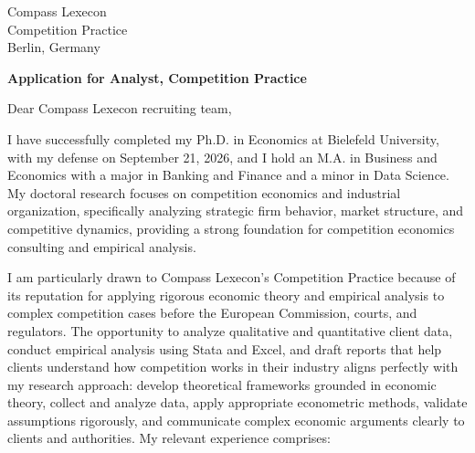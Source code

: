 \documentclass[11pt]{article}
\begin{document}
\vspace{0.1cm}

\vspace{0.1cm}

\noindent
Compass Lexecon \\
Competition Practice \\
Berlin, Germany

\vspace{0.12cm}

\noindent
\textbf{Application for Analyst, Competition Practice}

\vspace{0.1cm}

\noindent Dear Compass Lexecon recruiting team,

I have successfully completed my Ph.D. in Economics at Bielefeld University, with my defense on September 21, 2026, 
and I hold an M.A. in Business and Economics with a major in Banking and Finance and a minor in Data Science. 
My doctoral research focuses on competition economics and industrial organization, 
specifically analyzing strategic firm behavior, market structure, and competitive dynamics, 
providing a strong foundation for competition economics consulting and empirical analysis.

I am particularly drawn to Compass Lexecon's Competition Practice because of its reputation for applying rigorous economic theory and empirical analysis to complex competition cases before the European Commission, courts, and regulators. 
The opportunity to analyze qualitative and quantitative client data, conduct empirical analysis using Stata and Excel, and draft reports that help clients understand how competition works in their industry aligns perfectly with my research approach: 
develop theoretical frameworks grounded in economic theory, collect and analyze data, apply appropriate econometric methods, 
validate assumptions rigorously, and communicate complex economic arguments clearly to clients and authorities.
My relevant experience comprises:
\end{document}
